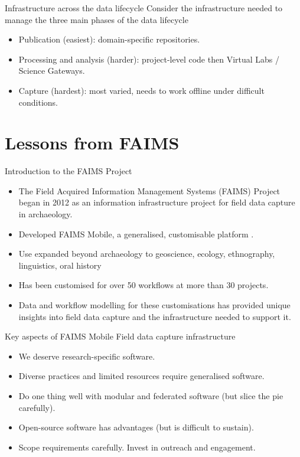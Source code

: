 \documentclass[aspectratio=169, 12pt]{beamer} %
\begin{document}
\begin{frame}{Infrastructure across the data lifecycle}
    Consider the infrastructure needed to manage the three main phases of the data lifecycle
      \begin{itemize}
        \item Publication (easiest): domain-specific repositories.
        \item Processing and analysis (harder): project-level code \cite{Stewart_Lowndes2017-lj} then Virtual Labs / Science Gateways.
        \item Capture (hardest): most varied, needs to work offline under difficult conditions.
    \end{itemize}
\end{frame}

\section{Lessons from FAIMS}

\begin{frame}{Introduction to the FAIMS Project}
      \begin{itemize}
        \item The Field Acquired Information Management Systems (FAIMS) Project began in 2012 as an information infrastructure project for field data capture in archaeology.
        \item Developed FAIMS Mobile, a generalised, customisable platform \cite{Ballsun-Stanton2018-zd}.
        \item Use expanded beyond archaeology to geoscience, ecology, ethnography, linguistics, oral history
        \item Has been customised for over 50 workflows at more than 30 projects. 
        \item Data and workflow modelling for these customisations has provided unique insights into field data capture and the infrastructure needed to support it.
    \end{itemize}
\end{frame}

\begin{frame}{Key aspects of FAIMS Mobile}
    Field data capture infrastructure
      \begin{itemize}
        \item We deserve research-specific software.
        \item Diverse practices and limited resources require generalised software.
        \item Do one thing well with modular and federated software (but slice the pie carefully).
        \item Open-source software has advantages (but is difficult to sustain). 
        \item Scope requirements carefully.
        \Item Invest in outreach and engagement.
    \end{itemize}
\end{frame}
\end{document}
